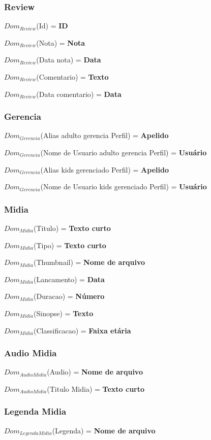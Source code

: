 \documentclass[12pt,a4paper]{article}
\newcommand{\createdomain}[3]{
    $Dom_{#1}$(#2) = {\bf #3}
}
\begin{document}
    \subsubsection{Review}
        \createdomain{Review}{Id}{ID}

        \createdomain{Review}{Nota}{Nota}

        \createdomain{Review}{Data nota}{Data}

        \createdomain{Review}{Comentario}{Texto}

        \createdomain{Review}{Data comentario}{Data}


    \subsubsection{Gerencia}
        \createdomain{Gerencia}{Alias adulto gerencia Perfil}{Apelido}

        \createdomain{Gerencia}{Nome de Usuario adulto gerencia Perfil}{Usuário}

        \createdomain{Gerencia}{Alias kids gerenciado Perfil}{Apelido}

        \createdomain{Gerencia}{Nome de Usuario kids gerenciado Perfil}{Usuário}


    \subsubsection{Midia}
        \createdomain{Midia}{Titulo}{Texto curto}

        \createdomain{Midia}{Tipo}{Texto curto}

        \createdomain{Midia}{Thumbnail}{Nome de arquivo}

        \createdomain{Midia}{Lancamento}{Data}

        \createdomain{Midia}{Duracao}{Número}

        \createdomain{Midia}{Sinopse}{Texto}

        \createdomain{Midia}{Classificacao}{Faixa etária}


    \subsubsection{Audio Midia}
        \createdomain{Audio Midia}{Audio}{Nome de arquivo}

        \createdomain{Audio Midia}{Titulo Midia}{Texto curto}


    \subsubsection{Legenda Midia}
        \createdomain{Legenda Midia}{Legenda}{Nome de arquivo}
\end{document}
